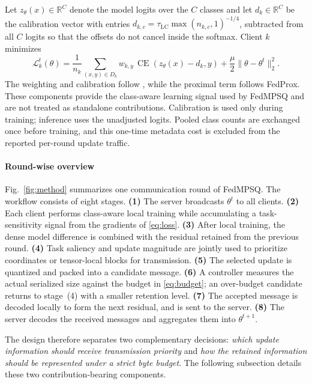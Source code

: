 \documentclass[conference,a4paper]{IEEEtran}
\begin{document}
Let $z_\theta(x)\in\mathbb{R}^{C}$ denote the model logits over the $C$
classes and let $d_k\in\mathbb{R}^{C}$ be the calibration vector with entries
$d_{k,c}=\tau_{\mathrm{LC}}\max(n_{k,c},1)^{-1/4}$, subtracted from all $C$
logits so that the offsets do not cancel inside the softmax. Client $k$
minimizes
\begin{equation}
\mathcal{L}_k^t(\theta)
=
\frac{1}{n_k}
\sum_{(x,y)\in D_k}
w_{k,y}\,
\operatorname{CE}\!\left(z_\theta(x)-d_k,y\right)
+
\frac{\mu}{2}
\|\theta-\theta^t\|_2^2 .
\label{eq:loss}
\end{equation}
The weighting and calibration follow
\cite{cui2019classbalanced,zhang2022fedlc}, while the proximal term follows
FedProx. These components provide the class-aware learning signal used by
FedMPSQ and are not treated as standalone contributions. Calibration is used
only during training; inference uses the unadjusted logits. Pooled class
counts are exchanged once before training, and this one-time metadata cost is
excluded from the reported per-round update traffic.

\paragraph{Round-wise overview}
Fig.~\ref{fig:method} summarizes one communication round of FedMPSQ. The
workflow consists of eight stages. \textbf{(1)} The server broadcasts
$\theta^t$ to all clients. \textbf{(2)} Each client performs class-aware local
training while accumulating a task-sensitivity signal from the gradients of
\eqref{eq:loss}. \textbf{(3)} After local training, the dense model difference
is combined with the residual retained from the previous round.
\textbf{(4)} Task saliency and update magnitude are jointly used to prioritize
coordinates or tensor-local blocks for transmission. \textbf{(5)} The
selected update is quantized and packed into a candidate message.
\textbf{(6)} A controller measures the actual serialized size against the
budget in \eqref{eq:budget}; an over-budget candidate returns to stage~(4)
with a smaller retention level. \textbf{(7)} The accepted message is decoded
locally to form the next residual, and is sent to the server. \textbf{(8)} The
server decodes the received messages and aggregates them into $\theta^{t+1}$.

The design therefore separates two complementary decisions:
\emph{which update information should receive transmission priority} and
\emph{how the retained information should be represented under a strict byte
budget}. The following subsection details these two contribution-bearing
components.
\end{document}
